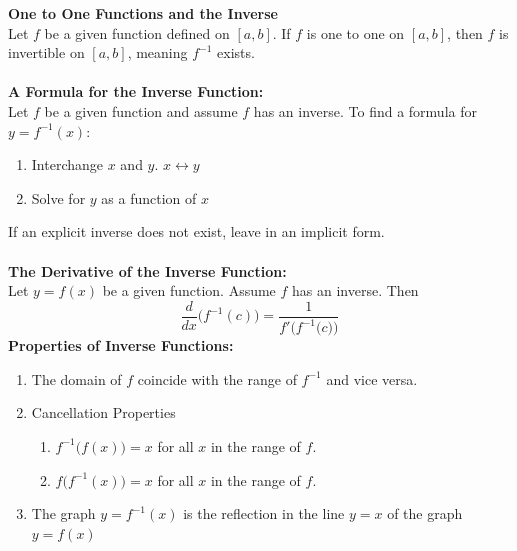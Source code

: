 \documentclass[14pt]{article}
\begin{document}
    \textbf{One to One Functions and the Inverse}\\
    Let $f$ be a given function defined on $[a,b]$. If $f$ is one to one
    on $[a,b]$, then $f$ is invertible on $[a,b]$, meaning $f^{-1}$
    exists.\\\\
    \textbf{A Formula for the Inverse Function:}\\
    Let $f$ be a given function and assume $f$ has an inverse. To find a
    formula for $y=f^{-1}(x)$:
    \begin{enumerate}
        \item Interchange $x$ and $y$. $x\leftrightarrow y$
        \item Solve for $y$ as a function of $x$
    \end{enumerate}
    If an explicit inverse does not exist, leave in an implicit
    form.\\\\
    \textbf{The Derivative of the Inverse Function:}\\
    Let $y=f(x)$ be a given function. Assume $f$ has an inverse. Then 
    $$\frac{d}{dx}\Big(f^{-1}(c)\Big)=\frac{1}{f'\Big(f^{-1}\big(c\big)
    \Big)}$$ \textbf{Properties of Inverse Functions:}\\
    \begin{enumerate}
        \item The domain of $f$ coincide with the range of $f^{-1}$ and
        vice versa.
        \item Cancellation Properties \begin{enumerate}
            \item $f^{-1}\Big(f(x)\Big)=x$ for all $x$ in the range of
            $f$.
            \item $f\Big(f^{-1}(x)\Big)=x$ for all $x$ in the range of
            $f$.
        \end{enumerate} 
        \item The graph $y=f^{-1}(x)$ is the reflection in the line
        $y=x$ of the graph $y=f(x)$
    \end{enumerate}
\end{document}
